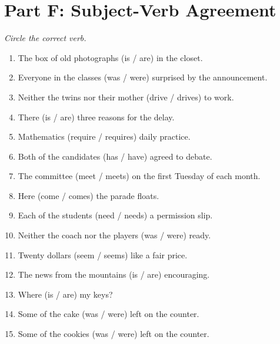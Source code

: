 \documentclass[11pt]{article}
\begin{document}
\section*{Part F: Subject-Verb Agreement}
\noindent\textit{Circle the correct verb.}
\begin{enumerate}
  \item The box of old photographs (is / are) in the closet.
  \vspace{6pt}
  \item Everyone in the classes (was / were) surprised by the announcement.
  \vspace{6pt}
  \item Neither the twins nor their mother (drive / drives) to work.
  \vspace{6pt}
  \item There (is / are) three reasons for the delay.
  \vspace{6pt}
  \item Mathematics (require / requires) daily practice.
  \vspace{6pt}
  \item Both of the candidates (has / have) agreed to debate.
  \vspace{6pt}
  \item The committee (meet / meets) on the first Tuesday of each month.
  \vspace{6pt}
  \item Here (come / comes) the parade floats.
  \vspace{6pt}
  \item Each of the students (need / needs) a permission slip.
  \vspace{6pt}
  \item Neither the coach nor the players (was / were) ready.
  \vspace{6pt}
  \item Twenty dollars (seem / seems) like a fair price.
  \vspace{6pt}
  \item The news from the mountains (is / are) encouraging.
  \vspace{6pt}
  \item Where (is / are) my keys?
  \vspace{6pt}
  \item Some of the cake (was / were) left on the counter.
  \vspace{6pt}
  \item Some of the cookies (was / were) left on the counter.
  \vspace{6pt}

\end{enumerate}
\end{document}
